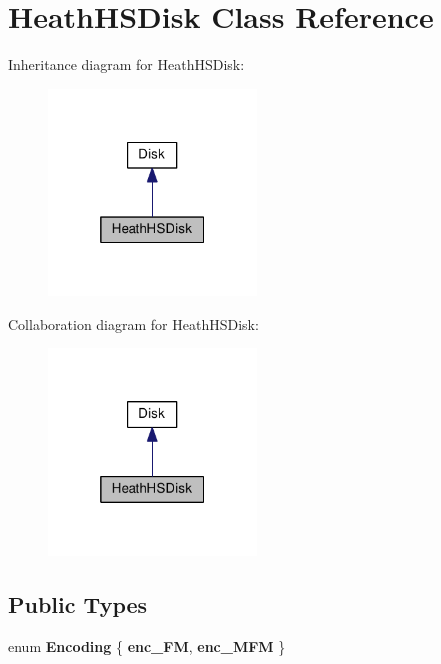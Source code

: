 \hypertarget{classHeathHSDisk}{}\section{Heath\+H\+S\+Disk Class Reference}
\label{classHeathHSDisk}


Inheritance diagram for Heath\+H\+S\+Disk\+:\nopagebreak
\begin{figure}[H]
\begin{center}
\leavevmode
\includegraphics[width=157pt]{classHeathHSDisk__inherit__graph}
\end{center}
\end{figure}


Collaboration diagram for Heath\+H\+S\+Disk\+:\nopagebreak
\begin{figure}[H]
\begin{center}
\leavevmode
\includegraphics[width=157pt]{classHeathHSDisk__coll__graph}
\end{center}
\end{figure}
\subsection*{Public Types}
\begin{DoxyCompactItemize}
\item 
\hypertarget{classDisk_a2eaa045357515c1586d007fb0698fce3}{}enum {\bfseries Encoding} \{ {\bfseries enc\+\_\+\+F\+M}, 
{\bfseries enc\+\_\+\+M\+F\+M}
 \}\label{classDisk_a2eaa045357515c1586d007fb0698fce3}

\end{DoxyCompactItemize}
